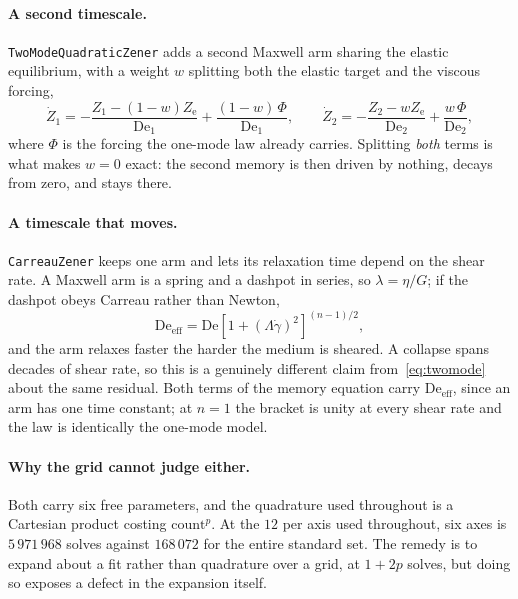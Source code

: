 \documentclass[10pt]{article}
\begin{document}
\paragraph{A second timescale.} \texttt{TwoModeQuadraticZener} adds a second Maxwell arm
sharing the elastic equilibrium, with a weight $w$ splitting both the elastic target and the
viscous forcing,
%
\begin{equation}
\dot Z_1 = -\frac{Z_1 - (1-w)Z_{\mathrm e}}{\mathrm{De}_1} + \frac{(1-w)\,\Phi}{\mathrm{De}_1},
\qquad
\dot Z_2 = -\frac{Z_2 - w Z_{\mathrm e}}{\mathrm{De}_2} + \frac{w\,\Phi}{\mathrm{De}_2},
\label{eq:twomode}
\end{equation}
%
where $\Phi$ is the forcing the one-mode law already carries. Splitting \emph{both} terms is
what makes $w = 0$ exact: the second memory is then driven by nothing, decays from zero, and
stays there.

\paragraph{A timescale that moves.} \texttt{CarreauZener} keeps one arm and lets its
relaxation time depend on the shear rate. A Maxwell arm is a spring and a dashpot in series,
so $\lambda = \eta/G$; if the dashpot obeys Carreau rather than Newton,
%
\begin{equation}
\mathrm{De}_{\mathrm{eff}} = \mathrm{De}\left[1 + (\Lambda\dot\gamma)^2\right]^{(n-1)/2},
\label{eq:carreauzener}
\end{equation}
%
and the arm relaxes faster the harder the medium is sheared. A collapse spans decades of
shear rate, so this is a genuinely different claim from~\eqref{eq:twomode} about the same
residual. Both terms of the memory equation carry $\mathrm{De}_{\mathrm{eff}}$, since an arm
has one time constant; at $n = 1$ the bracket is unity at every shear rate and the law is
identically the one-mode model.

\paragraph{Why the grid cannot judge either.} Both carry six free parameters, and the
quadrature used throughout is a Cartesian product costing $\text{count}^{p}$. At the
$12$ per axis used throughout, six axes is $5\,971\,968$ solves against $168\,072$ for the
entire standard set. The remedy is to expand about a fit rather than quadrature over a grid,
at $1 + 2p$ solves, but doing so exposes a defect in the expansion itself.
\end{document}
